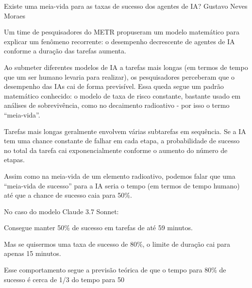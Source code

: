 \hypearticle
{Existe uma meia-vida para as taxas de sucesso dos agentes de IA?}
{Gustavo Neves Moraes}
{

\hspace*{1.5em} Um time de pesquisadores do METR propuseram um modelo matemático para explicar um fenômeno recorrente: o desempenho decrescente de agentes de IA conforme a duração das tarefas aumenta.

\subtitle{Objeto de Estudo}

\hspace*{1.5em} Ao submeter diferentes modelos de IA a tarefas mais longas (em termos de tempo que um ser humano levaria para realizar), os pesquisadores perceberam que o desempenho das IAs cai de forma previsível. Essa queda segue um padrão matemático conhecido: o modelo de taxa de risco constante, bastante usado em análises de sobrevivência, como no decaimento radioativo - por isso o termo “meia-vida”.

\subtitle{A lógica por trás da queda}

Tarefas mais longas geralmente envolvem várias subtarefas em sequência. Se a IA tem uma chance constante de falhar em
cada etapa, a probabilidade de sucesso no
total da tarefa cai exponencialmente
conforme o aumento do número de etapas.


Assim como na meia-vida de um
elemento radioativo, podemos falar que uma
“meia-vida de sucesso” para a IA seria o
tempo (em termos de tempo humano) até
que a chance de sucesso caia para 50\%.

\subtitle{Exemplo prático}

No caso do modelo Claude 3.7 Sonnet:

\begin{hypeitemize}
    
\item Consegue manter  50\% de sucesso em tarefas de até 59 minutos.
\item Mas se quisermos uma taxa de sucesso de 80\%, o limite de duração cai para apenas 15 minutos.
\item Esse comportamento segue a previsão teórica de que o tempo para 80\% de sucesso é cerca de 1/3 do tempo para 50%
\end{hypeitemize}

}
